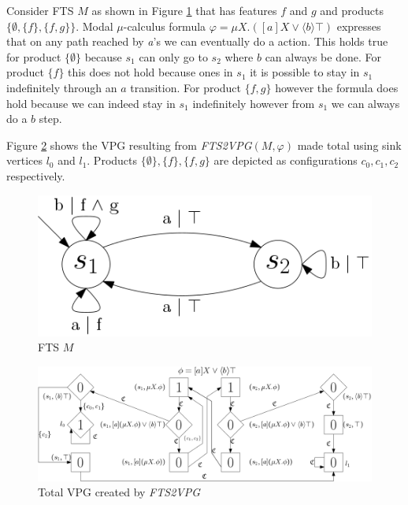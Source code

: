 \begin{example}
	\label{ex_FTS2VPG}
	Consider FTS $M$ as shown in Figure \ref{fig:exverfts} that has features $f$ and $g$ and products $\{\emptyset,\{f\},\{f,g\}\}$. Modal $\mu$-calculus formula $\varphi = \mu X.([a]X \vee \langle b \rangle \top)$ expresses that on any path reached by \textit{a}'s we can eventually do a  action. This holds true for product $\{\emptyset\}$ because $s_1$ can only go to $s_2$ where $b$ can always be done. For product $\{f\}$ this does not hold because ones in $s_1$ it is possible to stay in $s_1$ indefinitely through an $a$ transition. For product $\{f,g\}$ however the formula does hold because we can indeed stay in $s_1$ indefinitely however from $s_1$ we can always do a $b$ step.
	
	
	Figure \ref{fig:exvevpg} shows the VPG resulting from \textit{FTS2VPG}$(M,\varphi)$ made total using sink vertices $l_0$ and $l_1$. Products $\{\emptyset\},\{f\},\{f,g\}$ are depicted as configurations $c_0,c_1,c_2$ respectively.
	\begin{figure}[h]
		\centering
		\includegraphics[scale=0.3]{Examples/ExamleVerification/FTS}
		\caption[FTS $M$]{FTS $M$}
		\label{fig:exverfts}
	\end{figure}
	\begin{figure}[h]
		\centering
		\includegraphics[scale=0.3]{Examples/ExamleVerification/VPG}
		\caption[VPG]{Total VPG created by \textit{FTS2VPG}}
		\label{fig:exvevpg}
	\end{figure}	
\end{example}

